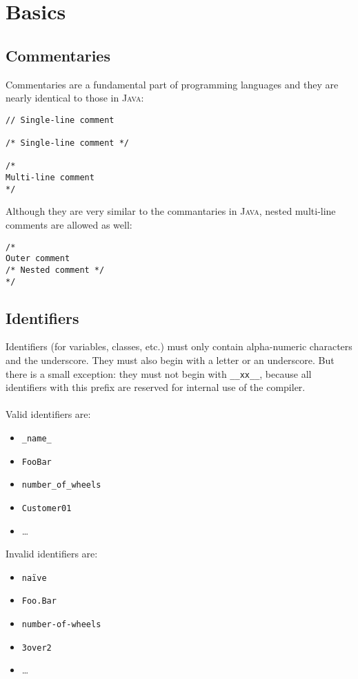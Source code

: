 \documentclass{report}
\def\java{\textsc{Java}\xspace}
\begin{document}
\section{Basics}

\subsection{Commentaries}

Commentaries are a fundamental part of programming languages and they are nearly identical to those
in \java:
\begin{lstlisting}
// Single-line comment

/* Single-line comment */

/*
Multi-line comment
*/
\end{lstlisting}
Although they are very similar to the commantaries in \java, nested multi-line comments are allowed as well:
\begin{lstlisting}
/*
Outer comment
/* Nested comment */
*/
\end{lstlisting}

\subsection{Identifiers}

Identifiers (for variables, classes, etc.) must only contain alpha-numeric characters and the underscore.
They must also begin with a letter or an underscore. But there is a small exception: they must not begin with
\texttt{\_\_xx\_\_}, because all identifiers with this prefix are reserved for internal use of the compiler. \\ \\
Valid identifiers are:
\begin{itemize}
	\item \texttt{\_name\_}
	\item \texttt{FooBar}
	\item \texttt{number\_of\_wheels}
	\item \texttt{Customer01}
	\item \dots
\end{itemize}
Invalid identifiers are:
\begin{itemize}
	\item \texttt{na\"{i}ve}
	\item \texttt{Foo.Bar}
	\item \texttt{number-of-wheels}
	\item \texttt{3over2}
	\item \dots
\end{itemize}
\end{document}
